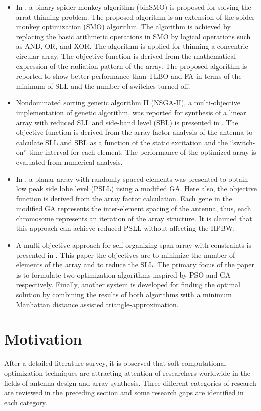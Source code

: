 \begin{itemize}
\item In \cite{arrayThin2}, a binary spider monkey algorithm (binSMO) is proposed for solving the arrat thinning problem. The proposed algorithm is an extension of the spider monkey optimization (SMO) algorithm. The algorithm is achieved by replacing the basic arithmetic operations in SMO by logical operations such as AND, OR, and XOR. The algorithm is applied for thinning a concentric circular array. The objective function is derived from the mathematical expression of the radiation pattern of the array. The proposed algorithm is reported to show better performance than TLBO and FA in terms of the minimum of SLL and the number of switches turned off.
\item Nondominated sorting genetic algorithm II (NSGA-II), a multi-objective implementation of genetic algorithm, was reported for synthesis of a linear array with reduced SLL and side-band level (SBL) is presented in \cite{arraySynth2}. The objective function is derived from the array factor analysis of the antenna to calculate SLL and SBL as a function of the static excitation and the ``switch-on'' time interval for each element. The performance of the optimized array is evaluated from numerical analysis.
\item In \cite{randomlySpacedArray}, a planar array with randomly spaced elements was presented to obtain low peak side lobe level (PSLL) using a modified GA. Here also, the objective function is derived from the array factor calculation. Each gene in the modified GA represents the inter-element spacing of the antenna, thus, each chromosome represents an iteration of the array structure. It is claimed that this approach can achieve reduced PSLL without affecting the HPBW.
\item A multi-objective approach for self-organizing span array with constraints is presented in \cite{selfOrgOpt}. This paper the objectives are to minimize the number of elements of the array and to reduce the SLL. The primary focus of the paper is to formulate two optimization algorithms inspired by PSO and GA respectively. Finally, another system is developed for finding the optimal solution by combining the results of both algorithms with a minimum Manhattan distance assisted triangle-approximation.
\end{itemize}

\section{Motivation} \label{c1sec_motiv}
After a detailed literature survey, it is observed that soft-computational optimization techniques are attracting attention of researchers worldwide in the fields of antenna design and array synthesis. Three different categories of research are reviewed in the preceding section and some research gaps are identified in each category.

